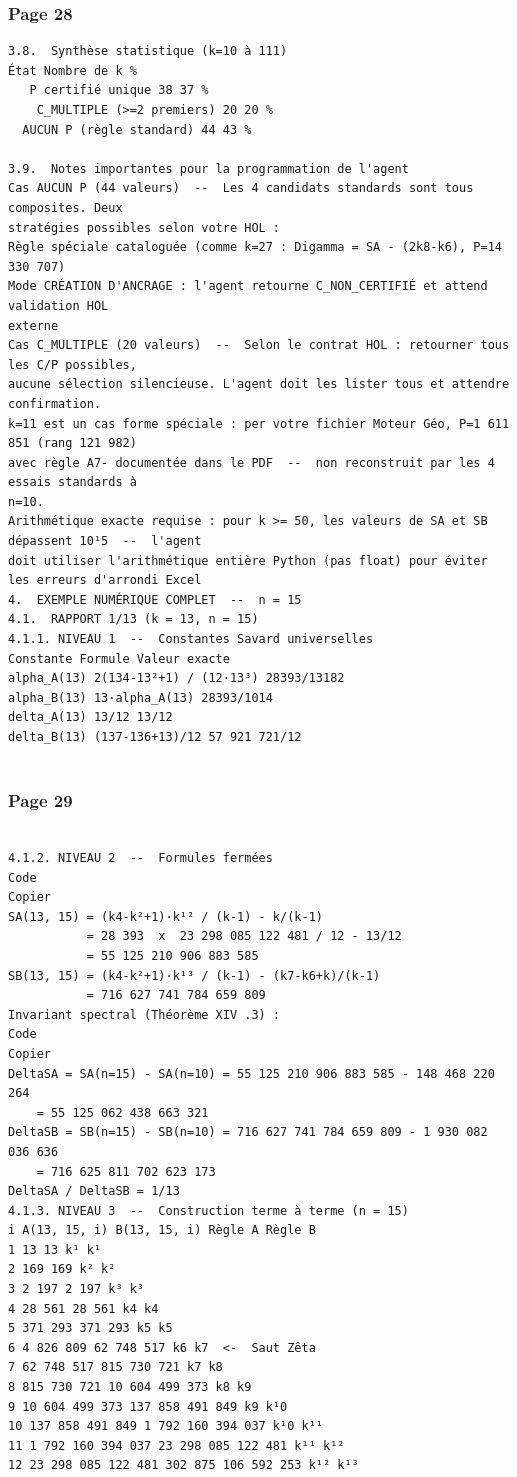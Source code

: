 \documentclass[11pt,a4paper]{article}
\begin{document}
\subsubsection*{Page 28}
\begin{Verbatim}[fontsize=\footnotesize]
3.8.  Synthèse statistique (k=10 à 111) 
État Nombre de k % 
   P certifié unique 38 37 % 
    C_MULTIPLE (>=2 premiers) 20 20 % 
  AUCUN P (règle standard) 44 43 % 
 
3.9.  Notes importantes pour la programmation de l'agent 
Cas AUCUN P (44 valeurs)  --  Les 4 candidats standards sont tous composites. Deux 
stratégies possibles selon votre HOL : 
Règle spéciale cataloguée (comme k=27 : Digamma = SA - (2k8-k6), P=14 330 707) 
Mode CRÉATION D'ANCRAGE : l'agent retourne C_NON_CERTIFIÉ et attend validation HOL 
externe 
Cas C_MULTIPLE (20 valeurs)  --  Selon le contrat HOL : retourner tous les C/P possibles, 
aucune sélection silencieuse. L'agent doit les lister tous et attendre confirmation. 
k=11 est un cas forme spéciale : per votre fichier Moteur Géo, P=1 611 851 (rang 121 982) 
avec règle A7- documentée dans le PDF  --  non reconstruit par les 4 essais standards à 
n=10. 
Arithmétique exacte requise : pour k >= 50, les valeurs de SA et SB dépassent 10¹5  --  l'agent 
doit utiliser l'arithmétique entière Python (pas float) pour éviter les erreurs d'arrondi Excel 
4.  EXEMPLE NUMÉRIQUE COMPLET  --  n = 15 
4.1.  RAPPORT 1/13 (k = 13, n = 15) 
4.1.1. NIVEAU 1  --  Constantes Savard universelles 
Constante Formule Valeur exacte 
alpha_A(13) 2(134-13²+1) / (12·13³) 28393/13182 
alpha_B(13) 13·alpha_A(13) 28393/1014 
delta_A(13) 13/12 13/12 
delta_B(13) (137-136+13)/12 57 921 721/12 
 
\end{Verbatim}
\medskip
\subsubsection*{Page 29}
\begin{Verbatim}[fontsize=\footnotesize]
 
4.1.2. NIVEAU 2  --  Formules fermées 
Code 
Copier 
SA(13, 15) = (k4-k²+1)·k¹² / (k-1) - k/(k-1) 
           = 28 393  x  23 298 085 122 481 / 12 - 13/12 
           = 55 125 210 906 883 585 
SB(13, 15) = (k4-k²+1)·k¹³ / (k-1) - (k7-k6+k)/(k-1) 
           = 716 627 741 784 659 809 
Invariant spectral (Théorème XIV .3) : 
Code 
Copier 
DeltaSA = SA(n=15) - SA(n=10) = 55 125 210 906 883 585 - 148 468 220 264 
    = 55 125 062 438 663 321 
DeltaSB = SB(n=15) - SB(n=10) = 716 627 741 784 659 809 - 1 930 082 036 636 
    = 716 625 811 702 623 173 
DeltaSA / DeltaSB = 1/13   
4.1.3. NIVEAU 3  --  Construction terme à terme (n = 15) 
i A(13, 15, i) B(13, 15, i) Règle A Règle B 
1 13 13 k¹ k¹ 
2 169 169 k² k² 
3 2 197 2 197 k³ k³ 
4 28 561 28 561 k4 k4 
5 371 293 371 293 k5 k5 
6 4 826 809 62 748 517 k6 k7  <-  Saut Zêta 
7 62 748 517 815 730 721 k7 k8 
8 815 730 721 10 604 499 373 k8 k9 
9 10 604 499 373 137 858 491 849 k9 k¹0 
10 137 858 491 849 1 792 160 394 037 k¹0 k¹¹ 
11 1 792 160 394 037 23 298 085 122 481 k¹¹ k¹² 
12 23 298 085 122 481 302 875 106 592 253 k¹² k¹³ 
\end{Verbatim}
\medskip
\end{document}
